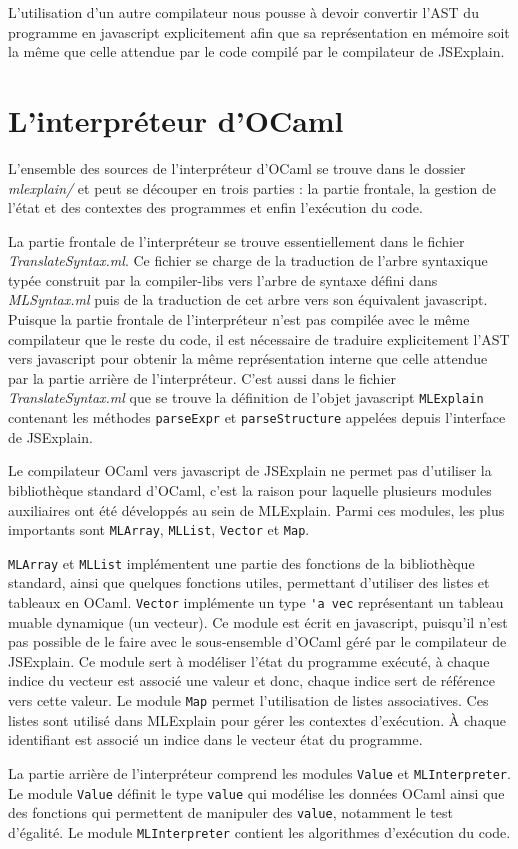 \documentclass{easychair}
\begin{document}
L'utilisation d'un autre compilateur nous pousse à devoir convertir l'AST du 
programme en javascript explicitement afin que sa représentation en mémoire 
soit la même que celle attendue par le code compilé par le compilateur de 
JSExplain.

\section{L'interpréteur d'OCaml}
L'ensemble des sources de l'interpréteur d'OCaml se trouve dans le dossier 
\emph{mlexplain/} et peut se découper en trois parties : la partie 
frontale, la gestion de l'état et des contextes des programmes et enfin 
l'exécution du code.

La partie frontale de l'interpréteur se trouve essentiellement dans le fichier 
\emph{TranslateSyntax.ml}. Ce fichier se charge de la traduction de 
l'arbre syntaxique typée construit par la compiler-libs vers l'arbre de syntaxe 
défini dans \emph{MLSyntax.ml} puis de la traduction de cet arbre vers son 
équivalent javascript. Puisque la partie frontale de l'interpréteur n'est pas 
compilée avec le même compilateur que le reste du code, il est nécessaire de 
traduire explicitement l'AST vers javascript pour obtenir la même 
représentation interne que celle attendue par la partie arrière de 
l'interpréteur. C'est aussi dans le fichier \emph{TranslateSyntax.ml} que se 
trouve la définition de l'objet javascript \verb|MLExplain| contenant les 
méthodes \verb|parseExpr| et \verb|parseStructure| appelées depuis l'interface 
de JSExplain.

Le compilateur OCaml vers javascript de JSExplain ne permet pas d'utiliser la 
bibliothèque standard d'OCaml, c'est la raison pour laquelle plusieurs modules 
auxiliaires ont été développés au sein de MLExplain. Parmi ces modules, les 
plus importants sont \verb|MLArray|, \verb|MLList|, \verb|Vector| et 
\verb|Map|.

\verb|MLArray| et \verb|MLList| implémentent une partie des fonctions de la 
bibliothèque standard, ainsi que quelques fonctions utiles, permettant 
d'utiliser des listes et tableaux en OCaml. \verb|Vector| implémente un type 
\verb|'a vec| représentant un tableau muable dynamique (un vecteur). Ce module 
est écrit en javascript, puisqu'il n'est pas possible de le faire avec le 
sous-ensemble d'OCaml géré par le compilateur de JSExplain. Ce module sert à 
modéliser l'état du programme exécuté, à chaque indice du vecteur est associé 
une valeur et donc, chaque indice sert de référence vers cette valeur. Le 
module \verb|Map| permet l'utilisation de listes associatives. Ces listes sont 
utilisé dans MLExplain pour gérer les contextes d'exécution. À chaque 
identifiant est associé un indice dans le vecteur état du programme.

La partie arrière de l'interpréteur comprend les modules \verb|Value| et 
\verb|MLInterpreter|. Le module \verb|Value| définit le type \verb|value| qui 
modélise les données OCaml ainsi que des fonctions qui permettent de manipuler 
des \verb|value|, notamment le test d'égalité. Le module \verb|MLInterpreter| 
contient les algorithmes d'exécution du code.


\end{document}
